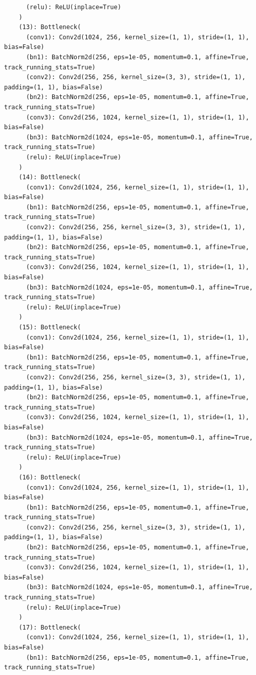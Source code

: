 \documentclass{article}
\begin{document}
\begin{verbatim}
      (relu): ReLU(inplace=True)
    )
    (13): Bottleneck(
      (conv1): Conv2d(1024, 256, kernel_size=(1, 1), stride=(1, 1), bias=False)
      (bn1): BatchNorm2d(256, eps=1e-05, momentum=0.1, affine=True, track_running_stats=True)
      (conv2): Conv2d(256, 256, kernel_size=(3, 3), stride=(1, 1), padding=(1, 1), bias=False)
      (bn2): BatchNorm2d(256, eps=1e-05, momentum=0.1, affine=True, track_running_stats=True)
      (conv3): Conv2d(256, 1024, kernel_size=(1, 1), stride=(1, 1), bias=False)
      (bn3): BatchNorm2d(1024, eps=1e-05, momentum=0.1, affine=True, track_running_stats=True)
      (relu): ReLU(inplace=True)
    )
    (14): Bottleneck(
      (conv1): Conv2d(1024, 256, kernel_size=(1, 1), stride=(1, 1), bias=False)
      (bn1): BatchNorm2d(256, eps=1e-05, momentum=0.1, affine=True, track_running_stats=True)
      (conv2): Conv2d(256, 256, kernel_size=(3, 3), stride=(1, 1), padding=(1, 1), bias=False)
      (bn2): BatchNorm2d(256, eps=1e-05, momentum=0.1, affine=True, track_running_stats=True)
      (conv3): Conv2d(256, 1024, kernel_size=(1, 1), stride=(1, 1), bias=False)
      (bn3): BatchNorm2d(1024, eps=1e-05, momentum=0.1, affine=True, track_running_stats=True)
      (relu): ReLU(inplace=True)
    )
    (15): Bottleneck(
      (conv1): Conv2d(1024, 256, kernel_size=(1, 1), stride=(1, 1), bias=False)
      (bn1): BatchNorm2d(256, eps=1e-05, momentum=0.1, affine=True, track_running_stats=True)
      (conv2): Conv2d(256, 256, kernel_size=(3, 3), stride=(1, 1), padding=(1, 1), bias=False)
      (bn2): BatchNorm2d(256, eps=1e-05, momentum=0.1, affine=True, track_running_stats=True)
      (conv3): Conv2d(256, 1024, kernel_size=(1, 1), stride=(1, 1), bias=False)
      (bn3): BatchNorm2d(1024, eps=1e-05, momentum=0.1, affine=True, track_running_stats=True)
      (relu): ReLU(inplace=True)
    )
    (16): Bottleneck(
      (conv1): Conv2d(1024, 256, kernel_size=(1, 1), stride=(1, 1), bias=False)
      (bn1): BatchNorm2d(256, eps=1e-05, momentum=0.1, affine=True, track_running_stats=True)
      (conv2): Conv2d(256, 256, kernel_size=(3, 3), stride=(1, 1), padding=(1, 1), bias=False)
      (bn2): BatchNorm2d(256, eps=1e-05, momentum=0.1, affine=True, track_running_stats=True)
      (conv3): Conv2d(256, 1024, kernel_size=(1, 1), stride=(1, 1), bias=False)
      (bn3): BatchNorm2d(1024, eps=1e-05, momentum=0.1, affine=True, track_running_stats=True)
      (relu): ReLU(inplace=True)
    )
    (17): Bottleneck(
      (conv1): Conv2d(1024, 256, kernel_size=(1, 1), stride=(1, 1), bias=False)
      (bn1): BatchNorm2d(256, eps=1e-05, momentum=0.1, affine=True, track_running_stats=True)

\end{verbatim}
\end{document}
